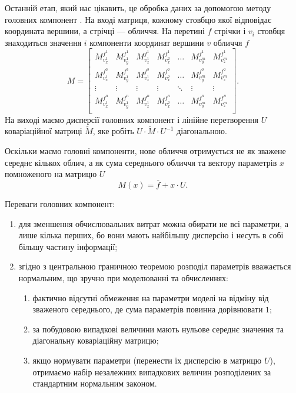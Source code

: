 Останній етап, який нас цікавить,
це обробка даних за допомогою методу головних компонент \cite{Aivazyan:1989}.
На вході матриця, кожному стовбцю якої відповідає координата вершини,
а стрічці --- обличчя.
На перетині $f$ стрічки і $v_i$ стовбця знаходиться значення $i$ компоненти
координат вершини $v$ обличчя $f$
\begin{equation*}
  M = \begin{bmatrix}
    M_{v_x^1}^{f^1} & M_{v_y^1}^{f^1} & M_{v_z^1}^{f^1} & M_{v_x^2}^{f^1}
      & \dots                         & M_{v_y^m}^{f^1} & M_{v_z^m}^{f^1} \\
    M_{v_x^1}^{f^2} & M_{v_y^1}^{f^2} & M_{v_z^1}^{f^2} & M_{v_x^2}^{f^2}
      & \dots                         & M_{v_y^m}^{f^2} & M_{v_z^m}^{f^2} \\
    \vdots          & \vdots          & \vdots          & \vdots
      & \ddots                        & \vdots          & \vdots \\
    M_{v_x^1}^{f^n} & M_{v_y^1}^{f^n} & M_{v_z^1}^{f^n} & M_{v_x^2}^{f^n}
      & \dots                         & M_{v_y^m}^{f^n} & M_{v_z^m}^{f^n} \\
  \end{bmatrix}.
\end{equation*}
На виході маємо дисперсії головних компонент
і лінійне перетворення $U$ коваріаційної матриці $\widetilde{M}$,
яке робіть $U \cdot \widetilde{M} \cdot U^{-1}$ діагональною.

Оскільки маємо головні компоненти,
нове обличчя отримується не як зважене середнє кількох облич,
а як сума середнього обличчя та вектору параметрів $x$
помноженого на матрицю $U$
\begin{equation*}
  M\left( x \right) = \overline{f} + x \cdot U.
\end{equation*}

Переваги головних компонент:
\begin{enumerate}
  \item для зменшення обчислювальних витрат можна обирати не всі параметри,
    а лише кілька перших,
    бо вони мають найбільшу дисперсію
    і несуть в собі більшу частину інформації;
  \item згідно з центральною граничною теоремою
    розподіл параметрів вважається нормальним,
      що зручно при моделюванні та обчисленнях:
  \begin{enumerate}
    \item фактично відсутні обмеження на параметри моделі на відміну від
      зваженого середнього, де сума параметрів повинна дорівнювати $1$;
    \item за побудовою випадкові величини мають нульове середнє значення
      та діагональну коваріаційну матрицю;
    \item якщо нормувати параметри (перенести їх дисперсію в матрицю $U$),
      отримаємо набір незалежних випадкових величин
      розподілених за стандартним нормальним законом.
  \end{enumerate}
\end{enumerate}

